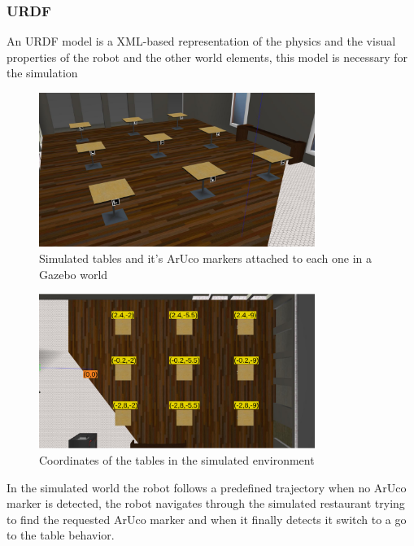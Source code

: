 \subsubsection{URDF}
An URDF model is a XML-based representation of the physics and the visual properties of the robot and the other world elements, this model is necessary for the simulation 
\begin{figure}[h!]
    \centering
 	\includegraphics[trim=0 0 0 0,clip,width=0.8\textwidth]{Figs/Gzworld.jpg}
    \caption{Simulated tables and it's ArUco markers attached to each one in a Gazebo world}
    \label{fig:Gzworld}
\end{figure}
\begin{figure}[h!]
    \centering
 	\includegraphics[trim=0 0 0 0,clip,width=0.8\textwidth]{Figs/Cords_tables.png}
    \caption{Coordinates of the tables in the simulated environment}
    \label{fig:Cords_Tables}
\end{figure}

In the simulated world the robot follows a predefined trajectory when no ArUco marker is detected, the robot navigates through the simulated restaurant trying to find the requested ArUco marker and when it finally detects it switch to a go to the table behavior.

